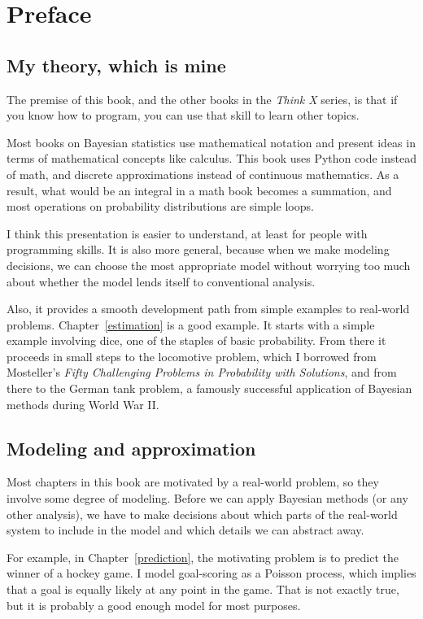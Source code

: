 \documentclass[12pt]{book}
\theoremstyle{exercise}
\begin{document}
\chapter{Preface}
\label{preface}

\section{My theory, which is mine}

The premise of this book, and the other books in the {\it Think X}
series, is that if you know how to program, you
can use that skill to learn other topics.

Most books on Bayesian statistics use mathematical notation and
present ideas in terms of mathematical concepts like calculus.
This book uses Python code instead of math, and discrete approximations
instead of continuous mathematics.  As a result, what would
be an integral in a math book becomes a summation, and
most operations on probability distributions are simple loops.

I think this presentation is easier to understand, at least for people with
programming skills.  It is also more general, because when we make
modeling decisions, we can choose the most appropriate model without
worrying too much about whether the model lends itself to conventional
analysis.

Also, it provides a smooth development path from simple examples to
real-world problems.  Chapter~\ref{estimation} is a good example.  It
starts with a simple example involving dice, one of the staples of
basic probability.  From there it proceeds in small steps to the
locomotive problem, which I borrowed from Mosteller's {\it
  Fifty Challenging Problems in Probability with Solutions}, and from
there to the German tank problem, a famously successful application of
Bayesian methods during World War II.


\section{Modeling and approximation}

Most chapters in this book are motivated by a real-world problem, so
they involve some degree of modeling.  Before we can apply Bayesian
methods (or any other analysis), we have to make decisions about which
parts of the real-world system to include in the model and which
details we can abstract away.  

For example, in Chapter~\ref{prediction}, the motivating problem is to
predict the winner of a hockey game.  I model goal-scoring as a
Poisson process, which implies that a goal is equally likely at any
point in the game.  That is not exactly true, but it is probably a
good enough model for most purposes.
\end{document}
